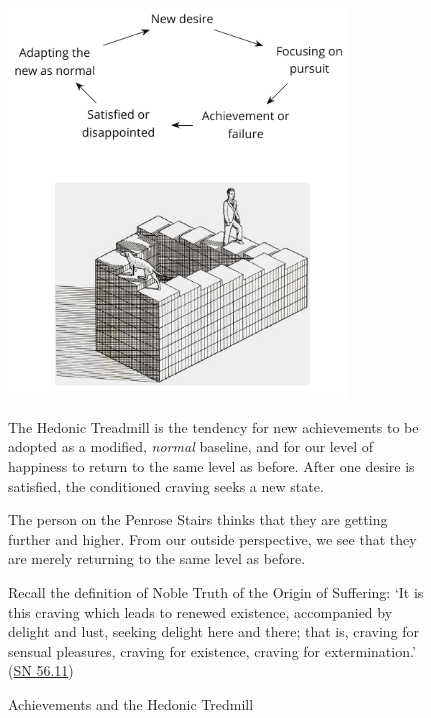 \begin{figure}[h]
\caption{Achievements and the Hedonic Tredmill}\label{fig-hedonic-treadmill}

\centering

\includegraphics[width=90mm]{./manuscript/tex/diagrams/hedonic-treadmill-stairs.pdf}

\bigskip

\begin{minipage}{0.8\linewidth}
\centering\footnotesize

The Hedonic Treadmill is the tendency for new achievements to be adopted as a modified, \emph{normal} baseline,
and for our level of happiness to return to the same level as before.
After one desire is satisfied, the conditioned craving seeks a new state.

\bigskip

The person on the Penrose Stairs thinks that
they are getting further and higher.
From our outside perspective,
we see that they are merely returning to the same level as before.

\bigskip

Recall the definition of Noble Truth of the Origin of Suffering:
`It is this craving which leads to renewed existence,
 accompanied by delight and lust, seeking delight here and there;
 that is, craving for sensual pleasures, craving for existence,
 craving for extermination.'
(\href{https://suttacentral.net/sn56.11/en/bodhi}{SN 56.11})

\end{minipage}

\end{figure}


